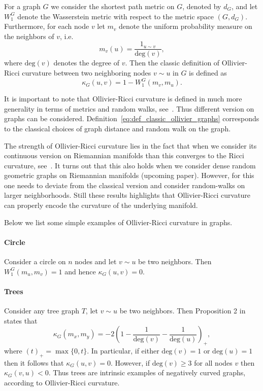 \documentclass{article}
\begin{document}
For a graph $G$ we consider the shortest path metric on $G$, denoted by $d_G$, and let $W_1^G$ denote the Wasserstein metric with respect to the metric space $(G,d_G)$. Furthermore, for each node $v$ let $m_v$ denote the uniform probability measure on the neighbors of $v$, i.e.
\[
	m_v(u) = \frac{1_{u \sim v}}{\mathrm{deg}(v)},
\]
where $\mathrm{deg}(v)$ denotes the degree of $v$. Then the classic definition of Ollivier-Ricci curvature between two neighboring nodes $v \sim u$ in $G$ is defined as
\begin{equation}\label{eq:def_classic_ollivier_graphs}
	\kappa_G(u,v) = 1 - W_1^G(m_v, m_u).
\end{equation}

It is important to note that Ollivier-Ricci curvature is defined in much more generality in terms of metrics and random walks, see~\cite{ollivier2009ricci}. Thus different version on graphs can be considered. Definition~\eqref{eq:def_classic_ollivier_graphs} corresponds to the classical choices of graph distance and random walk on the graph.

The strength of Ollivier-Ricci curvature lies in the fact that when we consider its continuous version on Riemannian manifolds than this converges to the Ricci curvature, see~\cite[Example 7]{ollivier2009ricci}. It turns out that this also holds when we consider dense random geometric graphs on Riemannian manifolds (upcoming paper). However, for this one needs to deviate from the classical version and consider random-walks on larger neighborhoods. Still these results highlights that Ollivier-Ricci curvature can properly encode the curvature of the underlying manifold. 


Below we list some simple examples of Ollivier-Ricci curvature in graphs.

\paragraph{Circle}

Consider a circle on $n$ nodes and let $v \sim u$ be two neighbors. Then $W_1^G(m_u,m_v) = 1$ and hence $\kappa_G(u,v) = 0$.

\paragraph{Trees}

Consider any tree graph $T$, let $v \sim u$ be two neighbors. Then Proposition 2 in \cite{jost2014ollivier} states that
\[
	\kappa_G(m_x,m_y) = -2\left(1 - \frac{1}{\mathrm{deg}(v)} - \frac{1}{\mathrm{deg}(u)}\right)_+, 
\]
where $(t)_+ = \max\{0,t\}$. In particular, if either $\mathrm{deg}(v) = 1$ or $\mathrm{deg}(u) = 1$ then it follows that $\kappa_G(u,v) = 0$. However, if $\mathrm{deg}(v) \ge 3$ for all nodes $v$ then $\kappa_G(v,u) < 0$. Thus trees are intrinsic examples of negatively curved graphs, according to Ollivier-Ricci curvature.
\end{document}
